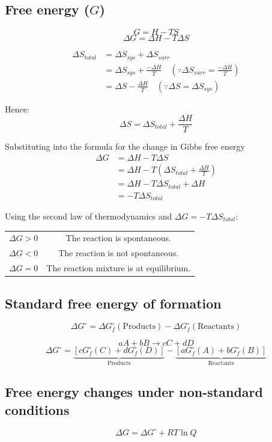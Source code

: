 \documentclass[11pt]{article}
\begin{document}
\newpage
\subsection{Free energy (\(G\))}
\label{sec:orgf956dd9}
\[G = H - TS\]
\[\Delta G = \Delta H - T \Delta S\]

\begin{align*}
\Delta S_{total} &= \Delta S_{sys} + \Delta S_{surr} \\
&= \Delta S_{sys} + \frac{- \Delta H}{T} \quad (\because \Delta S_{surr} = \frac{-\Delta H}{T}) \\
&= \Delta S - \frac{\Delta H}{T} \quad (\because \Delta S = \Delta S_{sys})
\end{align*}

Hence:
\[\Delta S = \Delta S_{total} + \frac{\Delta H}{T}\]

Substituting into the formula for the change in Gibbs free energy
\begin{align*}
\Delta G &= \Delta H - T \Delta S \\
&= \Delta H - T \left( \Delta S_{total} + \frac{\Delta H}{T} \right) \\
&= \Delta H - T \Delta S_{total} + \Delta H \\
&= - T \Delta S_{total}
\end{align*}

Using the second law of thermodynamics and \(\Delta G = - T \Delta S_{total}\):
\begin{center}
\begin{tabular}{c c}
\(\Delta G > 0\) & The reaction is spontaneous. \\
\(\Delta G < 0\) & The reaction is not spontaneous. \\
\(\Delta G = 0\) & The reaction mixture is at equilibrium.
\end{tabular}
\end{center}
\subsection{Standard free energy of formation}
\label{sec:orgb842e16}
\[\Delta G^{\circ} = \Delta G^{\circ}_f (\text{Products}) - \Delta G^{\circ}_f (\text{Reactants})\]

\[aA + bB \rightarrow cC + dD\]
\[\Delta G^{\circ} = \underbrace{[cG^{\circ}_f(C) + dG^{\circ}_f(D)]}_{\text{Products}} - \underbrace{[aG^{\circ}_f(A) + bG^{\circ}_f(B)]}_{\text{Reactants}}\]
\subsection{Free energy changes under non-standard conditions}
\label{sec:orgd231725}
\[\Delta G = \Delta G^{\circ} + RT \ln Q\]
\end{document}
